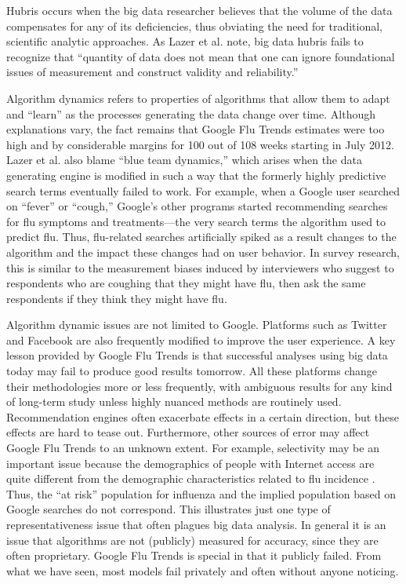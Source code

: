 \documentclass[]{krantz}
\begin{document}
Hubris occurs when the big data researcher believes that the volume of
the data compensates for any of its deficiencies, thus obviating the
need for traditional, scientific analytic approaches. As Lazer et al.
\citeyearpar{lazer2014parable} note, big data hubris fails to recognize
that ``quantity of data does not mean that one can ignore foundational
issues of measurement and construct validity and reliability.''

Algorithm dynamics refers to properties of algorithms that allow them to
adapt and ``learn'' as the processes generating the data change over
time. Although explanations vary, the fact remains that Google Flu
Trends estimates were too high and by considerable margins for 100 out
of 108 weeks starting in July 2012. Lazer et al.
\citeyearpar{lazer2014parable} also blame ``blue team dynamics,'' which
arises when the data generating engine is modified in such a way that
the formerly highly predictive search terms eventually failed to work.
For example, when a Google user searched on ``fever'' or ``cough,''
Google's other programs started recommending searches for flu symptoms
and treatments---the very search terms the algorithm used to predict
flu. Thus, flu-related searches artificially spiked as a result changes
to the algorithm and the impact these changes had on user behavior. In
survey research, this is similar to the measurement biases induced by
interviewers who suggest to respondents who are coughing that they might
have flu, then ask the same respondents if they think they might have
flu.

Algorithm dynamic issues are not limited to Google. Platforms such as
Twitter and Facebook are also frequently modified to improve the user
experience. A key lesson provided by Google Flu Trends is that
successful analyses using big data today may fail to produce good
results tomorrow. All these platforms change their methodologies more or
less frequently, with ambiguous results for any kind of long-term study
unless highly nuanced methods are routinely used. Recommendation engines
often exacerbate effects in a certain direction, but these effects are
hard to tease out. Furthermore, other sources of error may affect Google
Flu Trends to an unknown extent. For example, selectivity may be an
important issue because the demographics of people with Internet access
are quite different from the demographic characteristics related to flu
incidence \citep{thompson2006epidemiology}. Thus, the ``at risk''
population for influenza and the implied population based on Google
searches do not correspond. This illustrates just one type of
representativeness issue that often plagues big data analysis. In
general it is an issue that algorithms are not (publicly) measured for
accuracy, since they are often proprietary. Google Flu Trends is special
in that it publicly failed. From what we have seen, most models fail
privately and often without anyone noticing.
\end{document}
